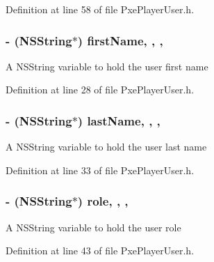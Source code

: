 Definition at line 58 of file Pxe\-Player\-User.\-h.

\hypertarget{interface_pxe_player_user_af3074e4f38e3083152cb1a2109bffa82}{
\subsubsection[{first\-Name}]{\setlength{\rightskip}{0pt plus 5cm}-\/ (N\-S\-String$\ast$) first\-Name\hspace{0.3cm}{\ttfamily [read]}, {\ttfamily [write]}, {\ttfamily [nonatomic]}, {\ttfamily [strong]}}}\label{interface_pxe_player_user_af3074e4f38e3083152cb1a2109bffa82}
A N\-S\-String variable to hold the user first name 

Definition at line 28 of file Pxe\-Player\-User.\-h.

\hypertarget{interface_pxe_player_user_ae3090771746d08c97a05cff607924477}{
\subsubsection[{last\-Name}]{\setlength{\rightskip}{0pt plus 5cm}-\/ (N\-S\-String$\ast$) last\-Name\hspace{0.3cm}{\ttfamily [read]}, {\ttfamily [write]}, {\ttfamily [nonatomic]}, {\ttfamily [strong]}}}\label{interface_pxe_player_user_ae3090771746d08c97a05cff607924477}
A N\-S\-String variable to hold the user last name 

Definition at line 33 of file Pxe\-Player\-User.\-h.

\hypertarget{interface_pxe_player_user_aa0dfff35b9add60a790f31b11e952bd0}{
\subsubsection[{role}]{\setlength{\rightskip}{0pt plus 5cm}-\/ (N\-S\-String$\ast$) role\hspace{0.3cm}{\ttfamily [read]}, {\ttfamily [write]}, {\ttfamily [nonatomic]}, {\ttfamily [strong]}}}\label{interface_pxe_player_user_aa0dfff35b9add60a790f31b11e952bd0}
A N\-S\-String variable to hold the user role 

Definition at line 43 of file Pxe\-Player\-User.\-h.

